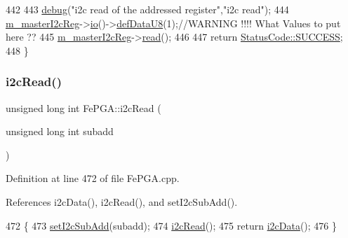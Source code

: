 \begin{DoxyCode}
442 
443   \hyperlink{classObject_aac010553f022165573714b7014a15f0d}{debug}(\textcolor{stringliteral}{"i2c read of the addressed register"},\textcolor{stringliteral}{"i2c read"});
444   \hyperlink{classFePGA_adb390ea8de4a6cbce648dc62e4405f32}{m\_masterI2cReg}->\hyperlink{classIOobject_af04fb94137c3d86849f478ac5afab5d1}{io}()->\hyperlink{classIOdata_a80bb230b61062b447db5832e43bf7b44}{defDataU8}(1);\textcolor{comment}{//WARNING !!!! What Values to put here ??}
445   \hyperlink{classFePGA_adb390ea8de4a6cbce648dc62e4405f32}{m\_masterI2cReg}->\hyperlink{classIOobject_aa07610c11963b1db6710e3c76ceea456}{read}();
446 
447   \textcolor{keywordflow}{return} \hyperlink{classStatusCode_a6f565cbeadc76d14c72f047e5e85eb4badd0da38d3ba0d922efd1f4619bc37ad8}{StatusCode::SUCCESS};
448 \}
\end{DoxyCode}
\mbox{\label{classFePGA_adf1c43786131d0f500b4662a877229c7}} 
\subsubsection{\texorpdfstring{i2c\+Read()}{i2cRead()}\hspace{0.1cm}{\footnotesize\ttfamily [2/2]}}
{\footnotesize\ttfamily unsigned long int Fe\+P\+G\+A\+::i2c\+Read (\begin{DoxyParamCaption}\item[{unsigned long int}]{subadd }\end{DoxyParamCaption})}



Definition at line 472 of file Fe\+P\+G\+A.\+cpp.



References i2c\+Data(), i2c\+Read(), and set\+I2c\+Sub\+Add().


\begin{DoxyCode}
472                                                         \{
473   \hyperlink{classFePGA_a37c1ee5bf89667c641f321479697166f}{setI2cSubAdd}(subadd);
474   \hyperlink{classFePGA_a939c5c23077210a2ad851a12694657a4}{i2cRead}();
475   \textcolor{keywordflow}{return} \hyperlink{classFePGA_a9c261a09d323c07ec4b9e925d4dfc353}{i2cData}();
476 \}
\end{DoxyCode}
\mbox{\label{classFePGA_ab51ac1c71e33f7444212de0e89e1f436}} 

